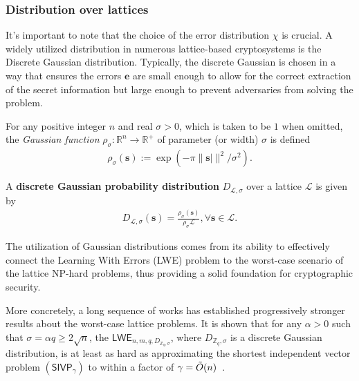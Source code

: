 \documentclass[cryptography,review,submit,pdftex,moreauthors,amsmath,amssymb,aps,strict]{Definitions/mdpi}
\begin{document}
\subsubsection{Distribution over lattices}
It's important to note that the choice of the error distribution $\chi$ is crucial. A widely utilized distribution in numerous lattice-based cryptosystems is the Discrete Gaussian distribution. Typically, the discrete Gaussian is chosen in a way that ensures the errors $\mathbf{e}$ are small enough to allow for the correct extraction of the secret information but large enough to prevent adversaries from solving the problem.


For any positive integer $n$ and real $\sigma>0$, which is taken to be $1$ when omitted, the \textit{Gaussian function} $\rho_{\sigma}:\mathbb{R}^n\to \mathbb{R}^+$ of parameter (or width) $\sigma$ is defined 
\begin{align}
    \rho_{\sigma}(\mathbf{s}):=\exp(-\pi\|\mathbf{s}|\|^2/\sigma^2).
\end{align}

A \textbf{discrete Gaussian probability distribution} $D_{\mathcal{L},\sigma}$ over a lattice $\mathcal{L}$ is given by
\begin{align}
    D_{\mathcal{L},\sigma}(\mathbf{s})=\displaystyle{\frac{\rho_{\sigma}(\mathbf{s})}{\rho_{\sigma}{\mathcal{L}}}}, \forall \mathbf{s}\in\mathcal{L}.
\end{align}


The utilization of Gaussian distributions comes from its ability to effectively connect the Learning With Errors (LWE) problem to the worst-case scenario of the lattice NP-hard problems, thus providing a solid foundation for cryptographic security.

More concretely, a long sequence of works has established progressively stronger results about the worst-case lattice problems. It is shown that for any $\alpha>0$ such that $\sigma=\alpha q \geq 2\sqrt{n}$, the $\mathsf{LWE}_{n,m,q, D_{\mathbb{Z}_q,\sigma}}$, where $D_{\mathbb{Z}_q,\sigma}$ is a discrete Gaussian distribution, is at least as hard as approximating the shortest independent vector problem $(\mathsf{SIVP}_{\gamma})$ to within a factor of $\gamma = \Tilde{O}(n)$~\cite{Reg09,RPS17}.

\end{document}

